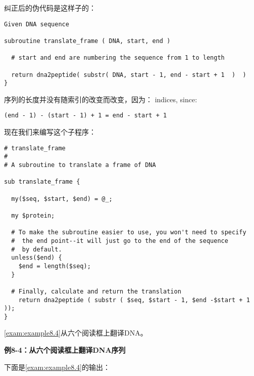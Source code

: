 纠正后的伪代码是这样子的：

\begin{lstlisting}
Given DNA sequence

subroutine translate_frame ( DNA, start, end )

  # start and end are numbering the sequence from 1 to length

  return dna2peptide( substr( DNA, start - 1, end - start + 1  )  )
}
\end{lstlisting}

序列的长度并没有随索引的改变而改变，因为：
indices, since:

\begin{lstlisting}
(end - 1) - (start - 1) + 1 = end - start + 1
\end{lstlisting}

现在我们来编写这个子程序：

\begin{lstlisting}
# translate_frame
#
# A subroutine to translate a frame of DNA

sub translate_frame {

  my($seq, $start, $end) = @_;

  my $protein;

  # To make the subroutine easier to use, you won't need to specify
  #  the end point--it will just go to the end of the sequence
  #  by default.
  unless($end) {
    $end = length($seq);
  }

  # Finally, calculate and return the translation
    return dna2peptide ( substr ( $seq, $start - 1, $end -$start + 1 ));
}
\end{lstlisting}

\autoref{exam:example8.4}从六个阅读框上翻译DNA。

\textbf{例8-4：从六个阅读框上翻译DNA序列}


下面是\autoref{exam:example8.4}的输出：

